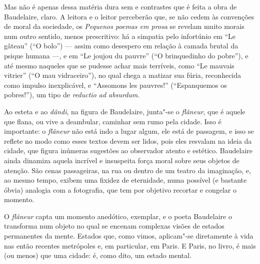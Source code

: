 Mas não é apenas dessa matéria dura sem e contrastes que é feita a obra de
Baudelaire, claro. A leitora e o leitor perceberão que, se não cedem
às convenções de moral da sociedade, os \textit{Pequenos poemas em
prosa} se revelam muito morais num outro sentido, menos prescritivo: há
a simpatia pelo infortúnio em “Le gâteau” (“O bolo”) --- assim como desespero
em relação à camada brutal da psique humana ---, e em “Le joujou du pauvre”
(“O brinquedinho do pobre”), e até mesmo naqueles que se pudesse achar
mais terríveis, como “Le mauvais vitrier” (“O mau vidraceiro”), no qual
chega a matizar sua fúria, reconhecida como impulso inexplicável, e
“Assomons les pauvres!” (“Espanquemos os pobres!”), um tipo de
\textit{reductio ad absurdum}.

Ao esteta e ao \textit{dândi}, na figura de Baudelaire, junta"-se o
\textit{flâneur}, que é aquele que flana, ou vive a deambular, caminhar
sem rumo pela cidade. Isso é importante: o \textit{flâneur} não está
indo a lugar algum, ele está de passagem, e isso se reflete no modo
como esses textos devem ser lidos, pois eles resvalam na ideia da
cidade, que figura inúmeras sugestões ao observador atento e estético.
Baudelaire ainda dinamiza aquela incrível e insuspeita força moral
sobre seus objetos de atenção. São cenas passageiras, na rua ou dentro
de um teatro da imaginação, e, ao mesmo tempo, exibem uma fixidez de
eternidade, numa possível (e bastante óbvia) analogia com
a fotografia, que tem por objetivo recortar e congelar o momento. 

O \textit{flâneur} capta um momento anedótico, exemplar, e o poeta
Baudelaire o transforma num objeto no qual se encenam complexas visões
de estados permanentes da mente. Estados que, como vimos, aplicam"-se diretamente
à vida nas então recentes
metrópoles e, em particular, em Paris. E Paris, no livro, é mais (ou
menos) que uma cidade: é, como dito, um estado mental.

